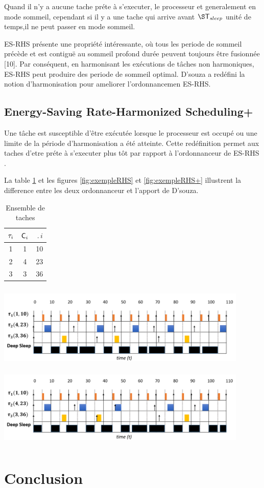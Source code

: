 Quand il n'y a aucune tache préte à s'executer, le processeur et
generalement en mode sommeil, cependant si il y a une tache qui arrive
avant $\S\period{sleep}$ unité de temps,il ne peut passer en mode
sommeil.

ES-RHS présente une propriété intéressante, où tous les periode de
sommeil précède et est contiguë au sommeil profond durée peuvent
toujours être fusionnée [10]. Par conséquent, en harmonisant les
exécutions de tâches non harmoniques, ES-RHS peut produire des periode
de sommeil optimal. D'souza \cite{DAR16} a redéfini la notion
d'harmonisation pour ameliorer l'ordonnancemen ES-RHS.
\subsection{Energy-Saving Rate-Harmonized Scheduling+}
\indent Une tâche est susceptible d'être exécutée lorsque le
processeur est occupé ou une limite de la période d'harmonisation a
été atteinte. Cette redéfinition permet aux taches d'etre préte à
s'executer plus tôt par rapport à l'ordonnanceur de ES-RHS
\cite{Rowe10}.

La table \ref{tab:exempleRHS} et les figures \ref{fig:exempleRHS} et
\ref{fig:exempleRHS+} illustrent la difference entre les deux
ordonnanceur et l'apport de D'souza.

\begin{table}[h]
\begin{center}
\begin{tabular}{|c|c|c|}
 \hline$\tau_{i}$ & $\mathsf{C}_{i}$ & $\period{i}$ \\ 
 \hline1 & 1 & 10 \\ 
 \hline 2 & 4 & 23 \\ 
 \hline 3 & 3 & 36 \\ 
 \hline 
 \end{tabular}
\end{center}
\caption{Ensemble de taches} \label{tab:exempleRHS}
\end{table}

\begin{center}
\includegraphics[height=4cm,width=12cm]{part1/rhs.png}
\label{fig:exempleRHS}
\includegraphics[height=4cm,width=12cm]{part1/rhs+.png}
\label{fig:exempleRHS+}
\end{center}

\section{Conclusion}
